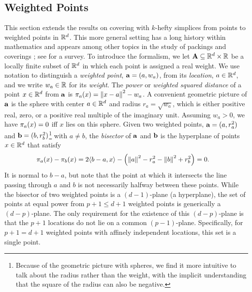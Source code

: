 \documentclass[a4paper,UKenglish,cleveref, autoref,numberwithinsect]{socg-lipics-v2021}
\newcommand {\mm}[1] {\ifmmode{#1}\else{\mbox{\(#1\)}}\fi}
\newcommand {\scalprod}[2] {{\langle #1 , #2 \rangle}}
\theoremstyle{plain}
\newcommand{\Rspace}        {\mm{{\mathbb R}}}
\newcommand{\AAA}           {\mm{\bf A}}
\newcommand{\aaa}           {\mm{\bf a}}
\newcommand{\bbb}           {\mm{\bf b}}
\newcommand{\wdist}[2]      {\mm{\pi_{#1}{({#2})}}}
\newcommand{\norm}[1]       {\mm{\|{#1}\|}}
\newcommand{\Edist}[2]      {\mm{\|{#1}-{#2}\|}}
\begin{document}
\subsection{Weighted Points}
\label{sec:2.5}
This section extends the results on covering with $k$-hefty simplices from points to weighted points in $\Rspace^d$.
This more general setting has a long history within mathematics and appears among other topics in the study of packings and coverings \cite{Rog64}; see \cite{Aur87} for a survey.
\smallskip
To introduce the formalism, we let $\AAA \subseteq \Rspace^d \times \Rspace$ be a locally finite subset of $\Rspace^d$ in which each point is assigned a real weight.
We use notation to distinguish a \emph{weighted point}, $\aaa = (a, w_a)$, from its \emph{location}, $a \in \Rspace^d$, and we write $w_a \in \Rspace$ for its \emph{weight}.
The \emph{power} or \emph{weighted squared distance} of a point $x \in \Rspace^d$ from $\aaa$ is $\wdist{a}{x} = \Edist{x}{a}^2 - w_a$.
A convenient geometric picture of $\aaa$ is the sphere with center $a \in \Rspace^d$ and radius $r_a = \sqrt{w_a}$, which is either positive real, zero, or a positive real multiple of the imaginary unit.
Assuming $w_a > 0$, we have $\wdist{a}{x} = 0$ iff $x$ lies on this sphere.
Given two weighted points, $\aaa = (a, r_a^2)$ and $\bbb = (b, r_b^2)$\footnote{Because of the geometric picture with spheres, we find it more intuitive to talk about the radius rather than the weight, with the implicit understanding that the square of the radius can also be negative.} with $a\neq b$, the \emph{bisector} of $\aaa$ and $\bbb$ is the hyperplane of points $x \in \Rspace^d$ that satisfy
\begin{align}
    \wdist{a}{x} - \wdist{b}{x}
    &=2 \scalprod{b-a}{x} - \left( \norm{a}^2 - r_a^2 - \norm{b}^2 + r_b^2 \right)
    = 0 .
\end{align}
It is normal to $b-a$, but note that the point at which it intersects the line passing through $a$ and $b$ is not necessarily halfway between these points.
While the bisector of two weighted points is a $(d-1)$-plane (a hyperplane), the set of points at equal power from $p+1 \leq d+1$ weighted points is generically a $(d-p)$-plane.
The only requirement for the existence of this $(d-p)$-plane is that the $p+1$ locations do not lie on a common $(p-1)$-plane.
Specifically, for $p+1 = d+1$ weighted points with affinely independent locations, this set is a single point.
\end{document}
